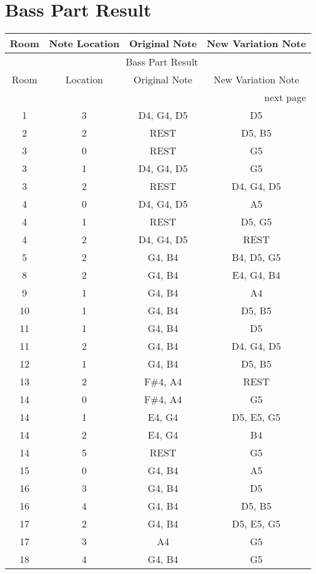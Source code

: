 \documentclass{article}
\begin{document}
\section*{Bass Part Result}\begin{longtable}{|c|c|c|c|}
\hline
Room & Note Location & Original Note & New Variation Note \\ \hline
\endfirsthead
\multicolumn{4}{c}{{\tablename\ \thetable{} Bass Part Result}} \\
\hline
Room & Location & Original Note & New Variation Note \\ \hline
\hline
\endhead
\hline
\multicolumn{4}{r}{next page}\endfoot
\hline
\endlastfoot
1 & 2 & REST & D5 \\ 
1 & 3 & D4, G4, D5 & D5 \\ 
\hline
2 & 2 & REST & D5, B5 \\ 
\hline
3 & 0 & REST & G5 \\ 
3 & 1 & D4, G4, D5 & G5 \\ 
3 & 2 & REST & D4, G4, D5 \\ 
\hline
4 & 0 & D4, G4, D5 & A5 \\ 
4 & 1 & REST & D5, G5 \\ 
4 & 2 & D4, G4, D5 & REST \\ 
\hline
5 & 2 & G4, B4 & B4, D5, G5 \\ 
\hline
8 & 2 & G4, B4 & E4, G4, B4 \\ 
\hline
9 & 1 & G4, B4 & A4 \\ 
\hline
10 & 1 & G4, B4 & D5, B5 \\ 
\hline
11 & 1 & G4, B4 & D5 \\ 
\hline
11 & 2 & G4, B4 & D4, G4, D5 \\ 
\hline
12 & 1 & G4, B4 & D5, B5 \\ 
\hline
13 & 2 & F\#4, A4 & REST \\ 
\hline
14 & 0 & F\#4, A4 & G5 \\ 
\hline
14 & 1 & E4, G4 & D5, E5, G5 \\ 
14 & 2 & E4, G4 & B4 \\ 
14 & 5 & REST & G5 \\ 
\hline
15 & 0 & G4, B4 & A5 \\ 
\hline
16 & 3 & G4, B4 & D5 \\ 
16 & 4 & G4, B4 & D5, B5 \\ 
\hline
17 & 2 & G4, B4 & D5, E5, G5 \\ 
17 & 3 & A4 & G5 \\ 
\hline
18 & 4 & G4, B4 & G5 \\ 

\end{longtable}
\end{document}
